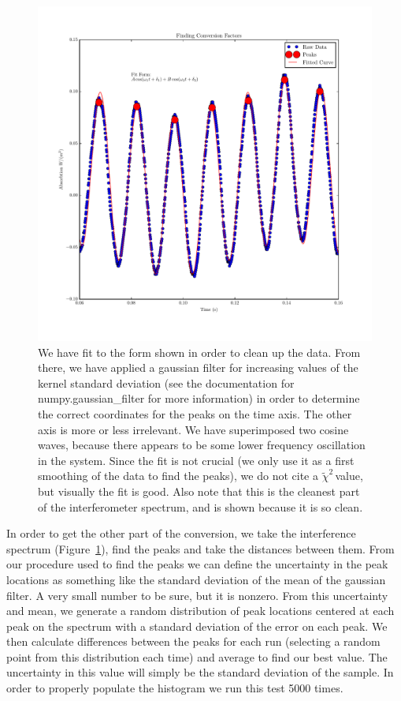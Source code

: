 \documentclass{article}
\newcommand{\redchi}{$\tilde{\chi}^2\,$}
\begin{document}
  \begin{figure}[!htb]
    \centering
    \includegraphics[scale=.75]{../plots/conversion.pdf}
    \caption{We have fit to the form shown in order to clean up the data.  From there, we have applied a gaussian filter for increasing values of the kernel standard deviation (see the documentation for numpy.gaussian\_filter for more information) in order to determine the correct coordinates for the peaks on the time axis.  The other axis is more or less irrelevant.  We have superimposed two cosine waves, because there appears to be some lower frequency oscillation in the system.  Since the fit is not crucial (we only use it as a first smoothing of the data to find the peaks), we do not cite a \redchi value, but visually the fit is good.  Also note that this is the cleanest part of the interferometer spectrum, and is shown because it is so clean.}
    \label{cal_graph}
  \end{figure}

  In order to get the other part of the conversion, we take the interference spectrum (Figure~\ref{cal_graph}), find the peaks and take the distances between them.  From our procedure used to find the peaks we can define the uncertainty in the peak locations as something like the standard deviation of the mean of the gaussian filter.  A very small number to be sure, but it is nonzero.  From this uncertainty and mean, we generate a random distribution of peak locations centered at each peak on the spectrum with a standard deviation of the error on each peak.  We then calculate differences between the peaks for each run (selecting a random point from this distribution each time) and average to find our best value.  The uncertainty in this value will simply be the standard deviation of the sample.  In order to properly populate the histogram we run this test 5000 times.
\end{document}
